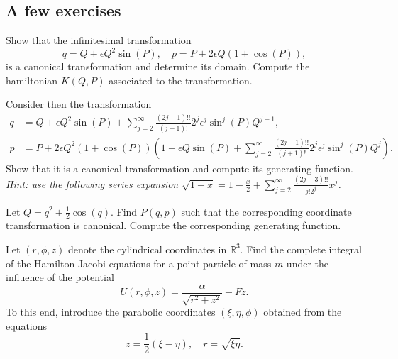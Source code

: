 \documentclass[english,fontsize=11pt,paper=a5,oneside]{scrbook}
\newcommand{\R}{\mathbb{R}}
\theoremstyle{definition}
\newenvironment{exercise}
  {\pushQED{\qed}\renewcommand{\qedsymbol}{$\maltese$}\exercisex}
  {\popQED\endexercisex}
\begin{document}
\subsection{A few exercises}
\begin{exercise}
  Show that the infinitesimal transformation
  \begin{equation}
    q = Q + \epsilon Q^2 \sin(P), \quad
    p = P + 2\epsilon Q(1+\cos(P)),
  \end{equation}
  is a canonical transformation and determine its domain.
  Compute the hamiltonian $K(Q,P)$ associated to the transformation.

  Consider then the transformation
  \begin{align}
    q & = Q + \epsilon Q^2 \sin(P) + \sum_{j=2}^\infty \frac{(2j-1)!!}{(j+1)!}2^j \epsilon^j \sin^j(P) Q^{j+1}, \\
    p & = P + 2\epsilon Q^2\left(1+\cos(P)\right)\left(
    1 + \epsilon Q \sin(P) + \sum_{j=2}^\infty \frac{(2j-1)!!}{(j+1)!}2^j \epsilon^j \sin^j(P) Q^{j}
    \right).
  \end{align}
  Show that it is a canonical transformation and compute its generating function.\\
  \textit{Hint: use the following series expansion $\sqrt{1-x} = 1 - \frac{x}{2} + \sum_{j=2}^\infty \frac{(2j-3)!!}{j! 2^j} x^j$.}
\end{exercise}

\begin{exercise}
  Let $Q = q^2 + \frac12 \cos(q)$.
  Find $P(q,p)$ such that the corresponding coordinate transformation is canonical.
  Compute the corresponding generating function.
\end{exercise}

\begin{exercise}[Parabolic coordinates]
  Let $(r,\phi,z)$ denote the cylindrical coordinates in $\R^3$.
  Find the complete integral of the Hamilton-Jacobi equations for a point particle of mass $m$ under the influence of the potential
  \begin{equation}
    U(r,\phi,z) = \frac{\alpha}{\sqrt{r^2+z^2}} - F z.
  \end{equation}
  To this end, introduce the parabolic coordinates $(\xi, \eta, \phi)$ obtained from the equations
  \begin{equation}
    z = \frac 12(\xi - \eta), \quad
    r = \sqrt{\xi\eta}.
  \end{equation}
\end{exercise}
\end{document}
